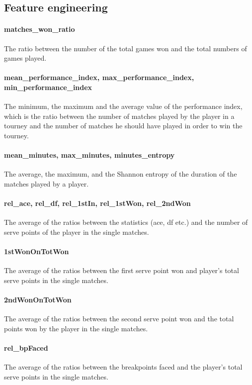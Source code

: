 \documentclass{article}
\begin{document}
\subsection{Feature engineering}

\paragraph{matches\_won\_ratio}
The ratio between the number of the total games won and the total numbers of games played.

\paragraph{mean\_performance\_index, max\_performance\_index, min\_performance\_index }
The minimum, the maximum and the average value of the performance index, which is the ratio between the number of matches played by the player in a tourney and the number of matches he should have played in order to win the tourney.

\paragraph{mean\_minutes, max\_minutes, minutes\_entropy }
The average, the maximum, and the Shannon entropy of the duration of the matches played by a player.

\paragraph{rel\_ace, rel\_df, rel\_1stIn, rel\_1stWon, rel\_2ndWon}
The average of the ratios between the statistics (ace, df etc.) and the number of serve points of the player in the single matches.

\paragraph{1stWonOnTotWon}
The average of the ratios between the first serve point won and player's total serve points in the single matches.

\paragraph{2ndWonOnTotWon}
The average of the ratios between the second serve point won and the total points won by the player in the single matches.

\paragraph{rel\_bpFaced}
The average of the ratios between the breakpoints faced and the player's total serve points in the single matches.
\end{document}
